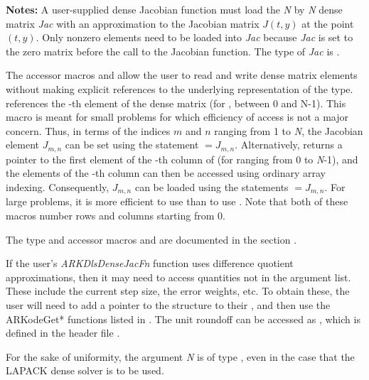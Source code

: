 \documentclass[letterpaper,10pt,english]{sphinxmanual}
\begin{document}
\begin{fulllineitems}
\textbf{Notes:} A user-supplied dense Jacobian function must load the
\emph{N} by \emph{N} dense matrix \emph{Jac} with an approximation to the Jacobian
matrix \(J(t,y)\) at the point \((t,y)\). Only nonzero
elements need to be loaded into \emph{Jac} because \emph{Jac} is set to
the zero matrix before the call to the Jacobian function. The type
of \emph{Jac} is .

The accessor macros  and  allow the user
to read and write dense matrix elements without making explicit
references to the underlying representation of the 
type.  references the -th element of
the dense matrix  (for ,  between 0 and
N-1). This macro is meant for small problems for which
efficiency of access is not a major concern. Thus, in terms of the
indices \(m\) and \(n\) ranging from 1 to \emph{N}, the
Jacobian element \(J_{m,n}\) can be set using the statement
 \(= J_{m,n}\). Alternatively,
 returns a pointer to the first element of the
-th column of  (for  ranging from 0 to \emph{N}-1),
and the elements of the -th column can then be accessed using
ordinary array indexing. Consequently, \(J_{m,n}\) can be
loaded using the statements  \(= J_{m,n}\). For large problems, it is more
efficient to use  than to use . Note
that both of these macros number rows and columns starting from 0.

The  type and accessor macros  and
 are documented in the section {\hyperref[linear_solvers/index:linearsolvers]{\emph{}}}.

If the user's \emph{ARKDlsDenseJacFn} function uses difference quotient
approximations, then it may need to access quantities not in the
argument list. These include the current step size, the error
weights, etc.  To obtain these, the user will need to add a pointer
to the  structure to their , and then use
the ARKodeGet* functions listed in
{\hyperref[c_interface/User_callable:cinterface-optionaloutputs]{\emph{}}}. The unit roundoff can be
accessed as , which is defined in the header
file .

For the sake of uniformity, the argument \emph{N} is of type ,
even in the case that the LAPACK dense solver is to be used.

\end{fulllineitems}
\end{document}
